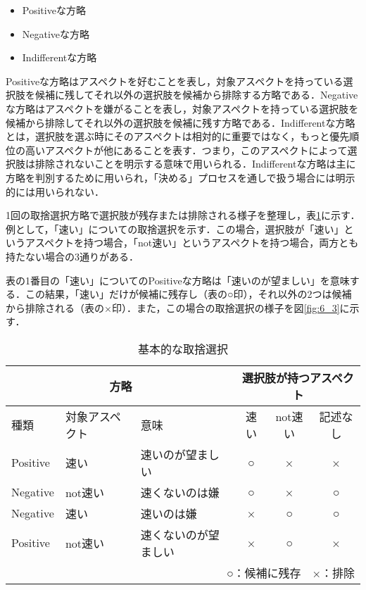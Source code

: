 \documentclass[japanese]{jnlp_1.3a}
\begin{document}
\begin{itemize}
\item Positiveな方略
\item Negativeな方略
\item Indifferentな方略
\end{itemize}

Positiveな方略はアスペクトを好むことを表し，対象アスペクトを持っている選択肢を候補に残してそれ以外の選択肢を候補から排除する方略である．Negativeな方略はアスペクトを嫌がることを表し，対象アスペクトを持っている選択肢を候補から排除してそれ以外の選択肢を候補に残す方略である．Indifferentな方略とは，選択肢を選ぶ時にそのアスペクトは相対的に重要ではなく，もっと優先順位の高いアスペクトが他にあることを表す．つまり，このアスペクトによって選択肢は排除されないことを明示する意味で用いられる．Indifferentな方略は主に方略を判別するために用いられ，「決める」プロセスを通しで扱う場合には明示的には用いられない．

1回の取捨選択方略で選択肢が残存または排除される様子を整理し，表\ref{tab:6_1}に示す．例として，「速い」についての取捨選択を示す．この場合，選択肢が「速い」というアスペクトを持つ場合，「not速い」というアスペクトを持つ場合，両方とも持たない場合の3通りがある．

表の1番目の「速い」についてのPositiveな方略は「速いのが望ましい」を意味する．この結果，「速い」だけが候補に残存し（表の○印），それ以外の2つは候補から排除される（表の×印）．また，この場合の取捨選択の様子を図\ref{fig:6_3}に示す．


\begin{table}[t]
  \caption{基本的な取捨選択}
  \begin{center}
    \begin{tabular}{|l|l|l||c|c|c|} \hline
      \multicolumn{3}{|c||}{方略} & 
      \multicolumn{3}{|c|}{選択肢が持つアスペクト}\\ \hline
      種類     & 対象アスペクト & 意味    & 速い & not速い & 記述なし\\
      \hline \hline
      Positive & 速い           & 速いのが望ましい     & ○ & × & ×\\ \hline
      Negative & not速い        & 速くないのは嫌       & ○ & × & ○\\ \hline
      Negative & 速い           & 速いのは嫌           & × & ○ & ○\\ \hline
      Positive & not速い        & 速くないのが望ましい & × & ○ & ×\\ \hline
      \multicolumn{6}{r}{○：候補に残存　×：排除}\\
    \end{tabular}
    \label{tab:6_1}
  \end{center}
\end{table}
\end{document}
